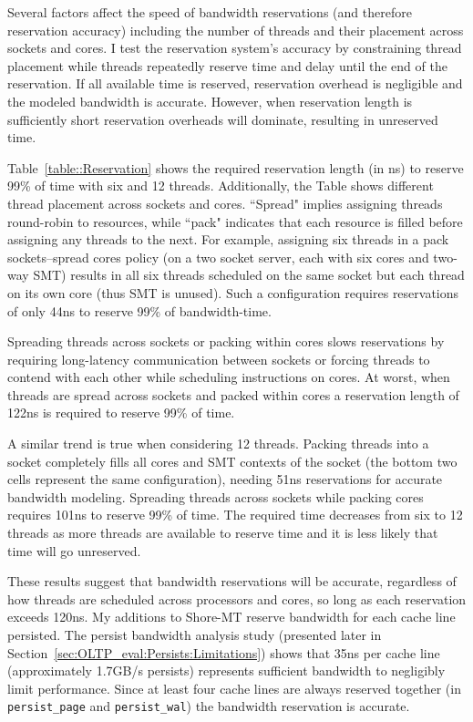 Several factors affect the speed of bandwidth reservations (and therefore reservation accuracy) including the number of threads and their placement across sockets and cores.
I test the reservation system's accuracy by constraining thread placement while threads repeatedly reserve time and delay until the end of the reservation.
If all available time is reserved, reservation overhead is negligible and the modeled bandwidth is accurate.
However, when reservation length is sufficiently short reservation overheads will dominate, resulting in unreserved time.



Table~\ref{table::Reservation} shows the required reservation length (in ns) to reserve 99\% of time with six and 12 threads.
Additionally, the Table shows different thread placement across sockets and cores.
``Spread" implies assigning threads round-robin to resources, while ``pack" indicates that each resource is filled before assigning any threads to the next.
For example, assigning six threads in a pack sockets--spread cores policy (on a two socket server, each with six cores and two-way SMT) results in all six threads scheduled on the same socket but each thread on its own core (thus SMT is unused).
Such a configuration requires reservations of only 44ns to reserve 99\% of bandwidth-time.

Spreading threads across sockets or packing within cores slows reservations by requiring long-latency communication between sockets or forcing threads to contend with each other while scheduling instructions on cores.
At worst, when threads are spread across sockets and packed within cores a reservation length of 122ns is required to reserve 99\% of time.

A similar trend is true when considering 12 threads.
Packing threads into a socket completely fills all cores and SMT contexts of the socket (the bottom two cells represent the same configuration), needing 51ns reservations for accurate bandwidth modeling.
Spreading threads across sockets while packing cores requires 101ns to reserve 99\% of time.
The required time decreases from six to 12 threads as more threads are available to reserve time and it is less likely that time will go unreserved.

These results suggest that bandwidth reservations will be accurate, regardless of how threads are scheduled across processors and cores, so long as each reservation exceeds 120ns.
My additions to Shore-MT reserve bandwidth for each cache line persisted.
The persist bandwidth analysis study (presented later in Section~\ref{sec:OLTP_eval:Persists:Limitations}) shows that 35ns per cache line (approximately 1.7GB/s persists) represents sufficient bandwidth to negligibly limit performance.
Since at least four cache lines are always reserved together (in \texttt{persist\_page} and \texttt{persist\_wal}) the bandwidth reservation is accurate.

